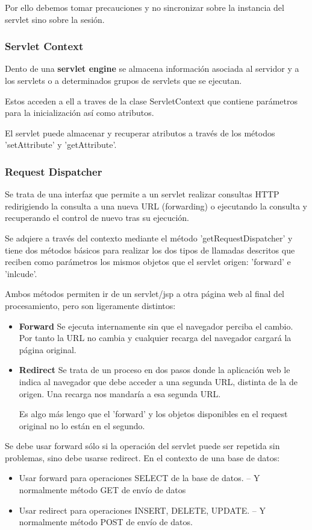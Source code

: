 \documentclass{apuntes}
\begin{document}
Por ello debemos tomar precauciones y no sincronizar sobre la instancia del servlet sino sobre la sesión.

\subsubsection{Servlet Context}
Dento de una \textbf{servlet engine} se almacena información asociada al servidor y a los servlets o a determinados grupos de servlets que se ejecutan.

Estos acceden a ell a traves de la clase ServletContext que contiene parámetros para la inicialización así como atributos.

El servlet puede almacenar y recuperar atributos a través de los métodos 'setAttribute' y 'getAttribute'.

\subsubsection{Request Dispatcher}
Se trata de una interfaz que permite a un servlet realizar consultas HTTP redirigiendo la consulta a una nueva URL (forwarding) o ejecutando la consulta y recuperando el control de nuevo tras su ejecución.

Se adqiere a través del contexto mediante el método 'getRequestDispatcher' y tiene dos métodos básicos para realizar los dos tipos de llamadas descritos que reciben como parámetros los mismos objetos que el servlet origen: 'forward' e 'inlcude'.

Ambos métodos permiten ir de un servlet/jsp a otra página web al final del procesamiento, pero son ligeramente distintos:
\begin{itemize}
\item \textbf{Forward}
Se ejecuta internamente sin que el navegador perciba el cambio. Por tanto la URL no cambia y cualquier recarga del navegador cargará la página original.
\item \textbf{Redirect}
Se trata de un proceso en dos pasos donde la aplicación web le indica al navegador que debe acceder a una segunda URL, distinta de la de origen. Una recarga nos mandaría a esa segunda URL.

Es algo más lengo que el 'forward' y los objetos disponibles en el request original no lo están en el segundo.
\end{itemize}

Se debe usar forward sólo si la operación del servlet puede ser repetida sin problemas, sino debe usarse redirect. En el contexto de una base de datos:
\begin{itemize}
\item Usar forward para operaciones SELECT de la base de datos.
– Y normalmente método GET de envío de datos
\item Usar redirect para operaciones INSERT, DELETE, UPDATE.
– Y normalmente método POST de envío de datos.
\end{itemize}
\end{document}
